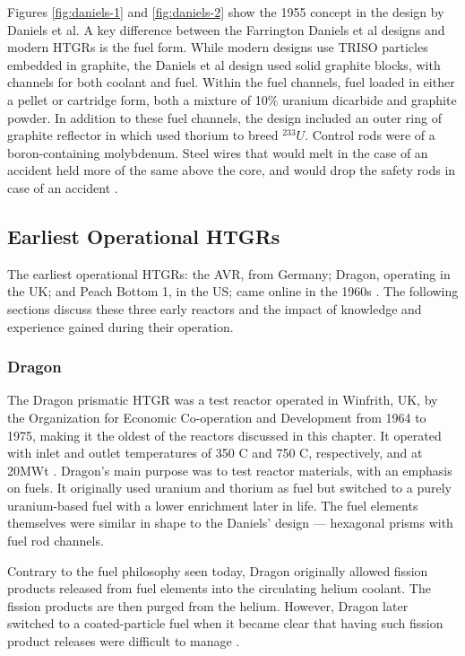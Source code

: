 Figures \ref{fig:daniels-1} and \ref{fig:daniels-2} show the 1955 concept in the design by Daniels et al.  A key difference between the Farrington Daniels et al designs and modern HTGRs is the fuel form.  While modern designs use TRISO particles embedded in graphite, the Daniels et al design used solid graphite blocks, with channels for both coolant and fuel.  Within the fuel channels, fuel loaded in either a pellet or cartridge form, both a mixture of 10$\%$ uranium dicarbide and graphite powder.  In addition to these fuel channels, the design included an outer ring of graphite reflector in which used thorium to breed $^{233}U$.  Control rods were of a boron-containing molybdenum.  Steel wires that would melt in the case of an accident held more of the same above the core, and would drop the safety rods in case of an accident \cite{simnad_early_1991}.

\subsection{Earliest Operational HTGRs}

The earliest operational HTGRs: the AVR, from Germany; Dragon, operating in the UK; and Peach Bottom 1, in the US; came online in the 1960s \cite{beck_high_nodate}.  The following sections discuss these three early reactors and the impact of knowledge and experience gained during their operation.

\subsubsection{Dragon}

The Dragon prismatic HTGR was a test reactor operated in Winfrith, UK, by the Organization for Economic Co-operation and Development from 1964 to 1975, making it the oldest of the reactors discussed in this chapter.  It operated with inlet and outlet temperatures of 350 \textdegree C and 750 \textdegree C, respectively, and at 20MWt \cite{beck_high_nodate}.  Dragon's main purpose was to test reactor materials, with an emphasis on fuels.  It originally used uranium and thorium as fuel but switched to a purely uranium-based fuel with a lower enrichment later in life.  The fuel elements themselves were similar in shape to the Daniels' design --- hexagonal prisms with fuel rod channels.

Contrary to the fuel philosophy seen today, Dragon originally allowed fission products released from fuel elements into the circulating helium coolant.  The fission products are then purged from the helium.  However, Dragon later switched to a coated-particle fuel when it became clear that having such fission product releases were difficult to manage \cite{simnad_early_1991}.

